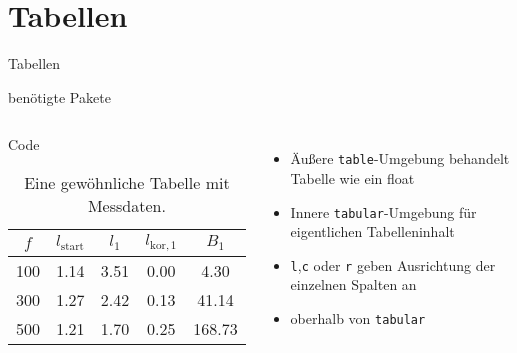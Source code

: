 \section{Tabellen}

\begin{frame}[fragile]{Tabellen}
  \begin{block}{benötigte Pakete}
    \begin{lstverbatim}
    \end{lstverbatim}
  \end{block}
  \begin{columns}[T]
    \fontsize{8}{6}
    \begin{block}{Code}
      \begin{lstverbatim}
      \begin{table}
        \centering
        \caption{Eine gewöhnliche Tabelle mit Messdaten.}
        \label{tab:some_data}
        \begin{tabular}{c c c c c}
          \toprule
          $f$ & $l_\text{start}$ & $l_1$ & $l_{\text{kor},1}$ & $B_1$ \\
          \midrule
          100 & 1.14 & 3.51 & 0.00 &   4.30 \\
          300 & 1.27 & 2.42 & 0.13 &  41.14 \\
          500 & 1.21 & 1.70 & 0.25 & 168.73 \\
          \bottomrule
        \end{tabular}
      \end{table}
      \end{lstverbatim}
    \end{block}
    \begin{itemize}
      \item Äußere \texttt{table}-Umgebung behandelt Tabelle wie ein float
      \item Innere \texttt{tabular}-Umgebung für eigentlichen Tabelleninhalt
      \item \texttt{l},\texttt{c} oder \texttt{r} geben Ausrichtung der einzelnen Spalten an
      \item
        \begin{lstverbatim}
        \label, \caption
        \end{lstverbatim}
        oberhalb von \texttt{tabular}
    \end{itemize}
  \end{columns}
\end{frame}

